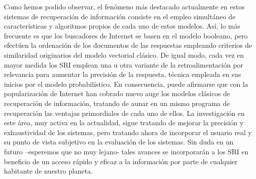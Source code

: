 \documentclass{article}
\begin{document}
Como hemos podido observar, el fenómeno más destacado actualmente en estos sistemas de recuperación de información consiste en el empleo simultáneo de características y algoritmos propios de cada uno de estos modelos. Así, lo más frecuente es que los buscadores de Internet se basen en el modelo booleano, pero efectúen la ordenación de los documentos de las respuestas empleando criterios de similaridad originarios del modelo vectorial clásico. De igual modo, cada vez en mayor medida los SRI emplean una u otra variante de la retroalimentación por relevancia para aumentar la precisión de la respuesta, técnica empleada en sus inicios por el modelo probabilístico.
En consecuencia, puede afirmarse que con la popularización de Internet han cobrado nuevo auge los modelos clásicos de recuperación de información, tratando de aunar en un mismo programa de recuperación las ventajas primordiales de cada uno de ellos. La investigación en este área, muy activa en la actualidad, sigue tratando de mejorar la precisión y exhaustividad de los sistemas, pero tratando ahora de incorporar el usuario real y su punto de vista subjetivo en la evaluación de los sistemas. Sin duda en un futuro –esperemos que no muy lejano- tales avances se incorporarán a los SRI en beneficio de un acceso rápido y eficaz a la información por parte de cualquier habitante de nuestro planeta.
\end{document}
